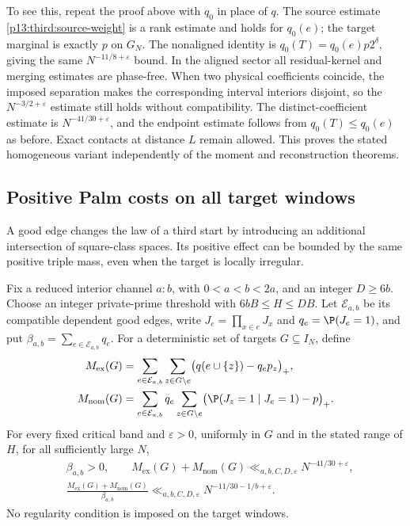 To see this, repeat the proof above with $q_0$ in place of $q$.
The source estimate \eqref{p13:third:source-weight} is a rank estimate
and holds for $q_0(e)$; the target marginal is exactly $p$ on $G_N$.
The nonaligned identity is
$q_0(T)=q_0(e)p2^\delta$, giving the same $N^{-11/8+\varepsilon}$ bound.
In the aligned sector all residual-kernel and merging estimates are
phase-free. When two physical coefficients coincide, the imposed
separation makes the corresponding interval interiors disjoint, so
the $N^{-3/2+\varepsilon}$ estimate still holds without compatibility.
The distinct-coefficient estimate is $N^{-41/30+\varepsilon}$, and the
endpoint estimate follows from $q_0(T)\le q_0(e)$ as before.
Exact contacts at distance $L$ remain allowed. This proves the stated
homogeneous variant independently of the moment and reconstruction theorems.

\subsection{Positive Palm costs on all target windows}

A good edge changes the law of a third start by introducing an additional
intersection of square-class spaces. Its positive effect can be bounded
by the same positive triple mass, even when the target is locally irregular.

\begin{proposition}
\label{p1:arith:palm}
\label{p1:arith:palm-all-targets}
Fix a reduced interior channel $a:b$, with $0<a<b<2a$, and an integer
$D\ge6b$. Choose an integer private-prime threshold with
$6bB\le H\le DB$.
Let $\mathcal E_{a,b}$ be its compatible dependent good edges, write $J_e=\prod_{x\in e}J_x$ and
$q_e=\P(J_e=1)$, and put $\beta_{a,b}=\sum_{e\in\mathcal E_{a,b}}q_e$.
For a deterministic set of targets $G\subseteq I_N$, define
\begin{align*}
 M_{\mathrm{ex}}(G)
   &=\sum_{e\in\mathcal E_{a,b}}\sum_{z\in G\setminus e}
       \bigl(q(e\cup\{z\})-q_ep_z\bigr)_+,\\
 M_{\mathrm{nom}}(G)
   &=\sum_{e\in\mathcal E_{a,b}}q_e\sum_{z\in G\setminus e}
       \bigl(\P(J_z=1\mid J_e=1)-p\bigr)_+.
\end{align*}
For every fixed critical band and $\varepsilon>0$, uniformly in $G$
and in the stated range of $H$, for all sufficiently large $N$,
\begin{equation}
 \begin{split}
 &\beta_{a,b}>0,\qquad
 M_{\mathrm{ex}}(G)+M_{\mathrm{nom}}(G)
     \ll_{a,b,C,D,\varepsilon}N^{-41/30+\varepsilon},\\
 &\frac{M_{\mathrm{ex}}(G)+M_{\mathrm{nom}}(G)}{\beta_{a,b}}
     \ll_{a,b,C,D,\varepsilon}N^{-11/30-1/b+\varepsilon}.
 \end{split}
 \label{p2:palm:all-targets-bound}
\end{equation}
No regularity condition is imposed on the target windows.
\end{proposition}

